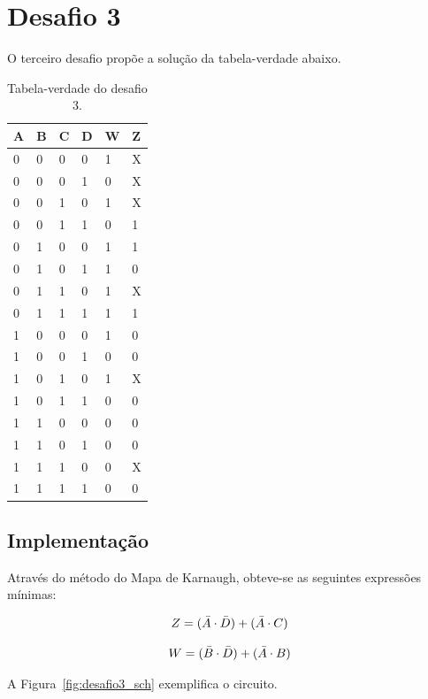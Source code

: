 \documentclass[12pt]{article}
\begin{document}
\clearpage

\section{Desafio 3}

O terceiro desafio propõe a solução da tabela-verdade abaixo.

\begin{table}[htb]
\centering
\caption{Tabela-verdade do desafio 3.}
\label{true-table-3}
\begin{tabular}{llll|ll}
	\textbf{A} & \textbf{B} & \textbf{C} & \textbf{D} & \textbf{W} & \textbf{Z} \\ \hline
	0 & 0 & 0 & 0 & 1 & X \\
	0 & 0 & 0 & 1 & 0 & X \\
	0 & 0 & 1 & 0 & 1 & X \\
	0 & 0 & 1 & 1 & 0 & 1 \\
	0 & 1 & 0 & 0 & 1 & 1 \\
	0 & 1 & 0 & 1 & 1 & 0 \\
	0 & 1 & 1 & 0 & 1 & X \\
	0 & 1 & 1 & 1 & 1 & 1 \\
	1 & 0 & 0 & 0 & 1 & 0 \\
	1 & 0 & 0 & 1 & 0 & 0 \\
	1 & 0 & 1 & 0 & 1 & X \\
	1 & 0 & 1 & 1 & 0 & 0 \\
	1 & 1 & 0 & 0 & 0 & 0 \\
	1 & 1 & 0 & 1 & 0 & 0 \\
	1 & 1 & 1 & 0 & 0 & X \\
	1 & 1 & 1 & 1 & 0 & 0
\end{tabular}
\end{table}

\subsection{Implementação}
Através do método do Mapa de Karnaugh, obteve-se as seguintes expressões mínimas:

\begin{equation}
\centering
Z = (\bar{A} \cdot \bar{D}) + (\bar{A} \cdot C)
\end{equation}

\begin{equation}
\centering
W = (\bar{B} \cdot \bar{D}) + (\bar{A} \cdot B)
\end{equation}

A Figura~\ref{fig:desafio3_sch} exemplifica o circuito.
    
\end{document}

